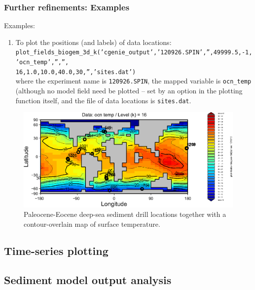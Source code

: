 \documentclass[11pt,fleqn]{book} %
\begin{document}
\subsubsection{Further refinements: Examples}

Examples: 
\begin{enumerate}
\item To plot the positions (and labels) of data locations:
\\ {\small \texttt{plot\_fields\_biogem\_3d\_k('cgenie\_output','120926.SPIN','',49999.5,-1,'ocn\_temp','','',\\16,1.0,10.0,40.0,30,'','sites.dat')}}
\\ where the experiment name is \texttt{120926.SPIN}, the mapped variable is \texttt{ocn\_temp} (although no model field need be plotted -- set by an option in the plotting function itself, and the file of data locations is \texttt{sites.dat}.
\end{enumerate}

\begin{figure}[ht]
\begin{center}
\includegraphics[scale=0.75]{cgenie_datalocations.eps}
\end{center}
\caption{Paleocene-Eocene deep-sea sediment drill locations together with a contour-overlain map of surface temperature.}
\label{fig:cgenie_datalocations}
\end{figure}


\subsection{Time-series plotting}


\subsection{Sediment model output analysis}
\end{document}
